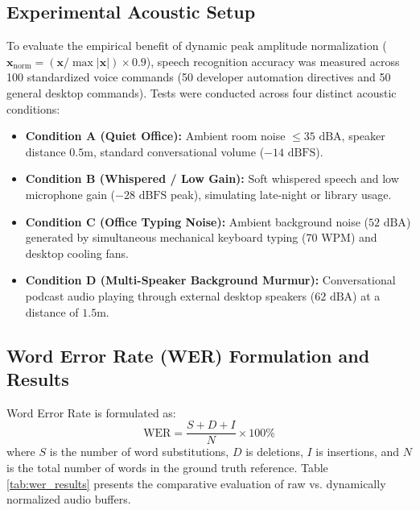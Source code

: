 \subsection{Experimental Acoustic Setup}
To evaluate the empirical benefit of dynamic peak amplitude normalization ($\mathbf{x}_{\text{norm}} = (\mathbf{x}/\max |\mathbf{x}|) \times 0.9$), speech recognition accuracy was measured across 100 standardized voice commands (50 developer automation directives and 50 general desktop commands). Tests were conducted across four distinct acoustic conditions:
\begin{itemize}
    \item \textbf{Condition A (Quiet Office):} Ambient room noise $\le 35\text{ dBA}$, speaker distance $0.5\text{m}$, standard conversational volume ($-14\text{ dBFS}$).
    \item \textbf{Condition B (Whispered / Low Gain):} Soft whispered speech and low microphone gain ($-28\text{ dBFS}$ peak), simulating late-night or library usage.
    \item \textbf{Condition C (Office Typing Noise):} Ambient background noise ($52\text{ dBA}$) generated by simultaneous mechanical keyboard typing (70 WPM) and desktop cooling fans.
    \item \textbf{Condition D (Multi-Speaker Background Murmur):} Conversational podcast audio playing through external desktop speakers ($62\text{ dBA}$) at a distance of $1.5\text{m}$.
\end{itemize}

\subsection{Word Error Rate (WER) Formulation and Results}
Word Error Rate is formulated as:
\begin{equation}
    \text{WER} = \frac{S + D + I}{N} \times 100\%
\end{equation}
where $S$ is the number of word substitutions, $D$ is deletions, $I$ is insertions, and $N$ is the total number of words in the ground truth reference. Table \ref{tab:wer_results} presents the comparative evaluation of raw vs. dynamically normalized audio buffers.

